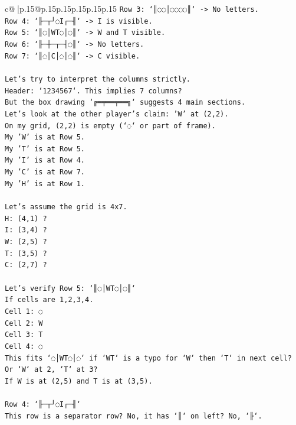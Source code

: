 \documentclass{article}
\begin{document}
{\begin{supertabular}{c@{$\;$}|p{.15\linewidth}@{}p{.15\linewidth}p{.15\linewidth}p{.15\linewidth}p{.15\linewidth}p{.15\linewidth}}
{{{\texttt{Row 3: `║◌◌│◌◌◌◌║` {-}> No letters.} \\
\texttt{Row 4: `╟─┬┘◌I┌─╢` {-}> I is visible.} \\
\texttt{Row 5: `║◌│WT◌│◌║` {-}> W and T visible.} \\
\texttt{Row 6: `╟─┼─┬─┤◌║` {-}> No letters.} \\
\texttt{Row 7: `║◌│C│◌│◌║` {-}> C visible.} \\
\\ 
\texttt{Let's try to interpret the columns strictly.} \\
\texttt{Header: `1234567`. This implies 7 columns?} \\
\texttt{But the box drawing `╔═╤══╤══╗` suggests 4 main sections.} \\
\texttt{Let's look at the other player's claim: 'W' at (2,2).} \\
\texttt{On my grid, (2,2) is empty (`◌` or part of frame).} \\
\texttt{My 'W' is at Row 5.} \\
\texttt{My 'T' is at Row 5.} \\
\texttt{My 'I' is at Row 4.} \\
\texttt{My 'C' is at Row 7.} \\
\texttt{My 'H' is at Row 1.} \\
\\ 
\texttt{Let's assume the grid is 4x7.} \\
\texttt{H: (4,1) ?} \\
\texttt{I: (3,4) ?} \\
\texttt{W: (2,5) ?} \\
\texttt{T: (3,5) ?} \\
\texttt{C: (2,7) ?} \\
\\ 
\texttt{Let's verify Row 5: `║◌│WT◌│◌║`} \\
\texttt{If cells are 1,2,3,4.} \\
\texttt{Cell 1: ◌} \\
\texttt{Cell 2: W} \\
\texttt{Cell 3: T} \\
\texttt{Cell 4: ◌} \\
\texttt{This fits `◌│WT◌│◌` if `WT` is a typo for `W` then `T` in next cell? Or `W` at 2, `T` at 3?} \\
\texttt{If W is at (2,5) and T is at (3,5).} \\
\\ 
\texttt{Row 4: `╟─┬┘◌I┌─╢`} \\
\texttt{This row is a separator row? No, it has `║` on left? No, `╟`.} \\
}}}
\end{supertabular}}
\end{document}
